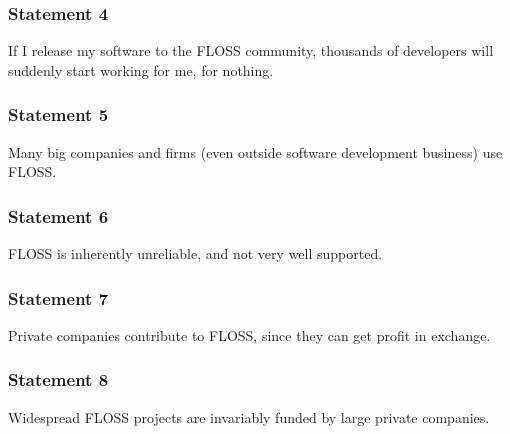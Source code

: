 
\begin{frame}
 \frametitle{Statement 4}
 \begin{center}
  \begin{LARGE} If I release my software to the FLOSS community, thousands of developers 
will suddenly start working for me, for nothing. \end{LARGE}
 \end{center}

\end{frame}


\begin{frame}
 \frametitle{Statement 5}
 \begin{center}
  \begin{LARGE} Many big companies and firms (even outside software development business) use FLOSS. \end{LARGE}
 \end{center}

\end{frame}


\begin{frame}
 \frametitle{Statement 6}
 \begin{center}
  \begin{LARGE} FLOSS is inherently unreliable, and not very well supported. \end{LARGE}
 \end{center}

\end{frame}


\begin{frame}
 \frametitle{Statement 7}
 \begin{center}
  \begin{LARGE} Private companies contribute to FLOSS, since they can get profit in exchange. \end{LARGE}
 \end{center}

\end{frame}


\begin{frame}
 \frametitle{Statement 8}
 \begin{center}
  \begin{LARGE} Widespread FLOSS projects are invariably funded by large private companies. \end{LARGE}
 \end{center}

\end{frame}

